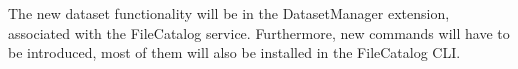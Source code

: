 \documentclass{scrreprt}
\begin{document}
The new dataset functionality will be in the DatasetManager extension, associated with the FileCatalog  service. Furthermore, new commands will have to be introduced, most of them will also be installed in the FileCatalog CLI.
%
%
%
%
%
\end{document}
